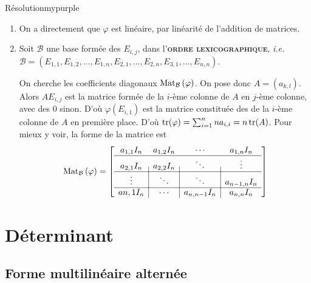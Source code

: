     \begin{demo}{Résolution}{mypurple}
        \begin{enumerate}[label = \textcolor{mypurple}{\alph* |}]
            \item On a directement que $\varphi$ est linéaire, par linéarité de l’addition de matrices.
            \item Soit $\mathcal{B}$ une base formée des $E_{i,j}$, dans l’\textbf{\textsc{ordre lexicographique}}, \textit{i.e.} $\mathcal{B} = (E_{1,1}, E_{1,2}, \ldots, E_{1,n}, E_{2,1}, \ldots, E_{2,n}, E_{3,1}, \ldots, E_{n,n})$.
            
            On cherche les coefficients diagonaux $\text{Mat}_{\mathcal{B}}\left(\varphi\right)$. On pose donc $A = (a_{k,l})$. Alors $AE_{i,j}$ est la matrice formée de la $i$-ème colonne de $A$ en $j$-ème colonne, avec des $0$ sinon. D’où $\varphi(E_{i,1})$ est la matrice constituée des de la $i$-ème colonne de $A$ en première place. D’où $\operatorname{tr}(\varphi) = \sum_{i=1}^{n} n a_{i,i} = n \operatorname{tr}(A)$.
            Pour mieux y voir, la forme de la matrice est \[ \text{Mat}_{\mathcal{B}}\left(\varphi\right) = \left[ \begin{array}{c | c | c | c}
                a_{1,1} I_n & a_{1,2} I_n & \cdots & a_{1,n} I_n \\
                \hline
                a_{2,1} I_n & a_{2,2} I_n & \ddots & \vdots \\
                \hline
                \vdots & \ddots & \ddots & a_{n-1, n} I_n \\
                \hline
                a{n,1} I_n & \cdots & a_{n,n-1} I_n & a_{n,n} I_n
            \end{array} \right] \]
        \end{enumerate}
    \end{demo}

\newpage

\section{Déterminant}

\subsection{Forme multilinéaire alternée}

